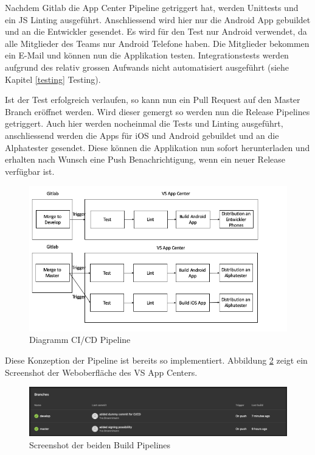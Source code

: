 Nachdem Gitlab die App Center Pipeline getriggert hat, werden Unittests und ein JS Linting ausgeführt. Anschliessend wird hier nur die Android App gebuildet und an die Entwickler gesendet. Es wird für den Test nur Android verwendet, da alle Mitglieder des Teams nur Android Telefone haben. Die Mitglieder bekommen ein E-Mail und können nun die Applikation testen. Integrationstests werden aufgrund des relativ grossen Aufwands nicht automatisiert ausgeführt (siehe Kapitel \ref{testing} Testing).

Ist der Test erfolgreich verlaufen, so kann nun ein Pull Request auf den Master Branch eröffnet werden. Wird dieser gemergt so werden nun die Release Pipelines getriggert. Auch hier werden nocheinmal die Tests und Linting ausgeführt, anschliessend werden die Apps für iOS und Android gebuildet und an die Alphatester gesendet. Diese können die Applikation nun sofort herunterladen und erhalten nach Wunsch eine Push Benachrichtigung, wenn ein neuer Release verfügbar ist.

\begin{figure}[H]
    \centering
    \includegraphics[width=\textwidth]{images/CICD.png}
    \caption{Diagramm CI/CD Pipeline}
    \label{fig:cicd_pipeline}
\end{figure}

Diese Konzeption der Pipeline ist bereits so implementiert. Abbildung \ref{fig:cicd_overview} zeigt ein Screenshot der Weboberfläche des VS App Centers.

\begin{figure}[H]
    \centering
    \includegraphics[width=\textwidth]{images/Overview_CICD.png}
    \caption{Screenshot der beiden Build Pipelines}
    \label{fig:cicd_overview}
\end{figure}

